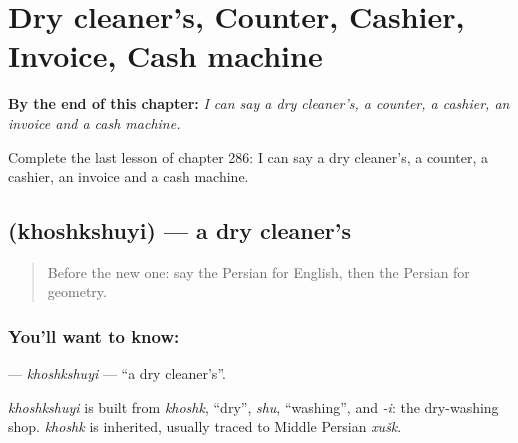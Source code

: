 
\chapter{Dry cleaner's, Counter, Cashier, Invoice, Cash machine}
\label{ch:fa-dry-cleaner-s-counter-cashier-invoice-cash-machine}

\begin{chapteropening}
\textbf{By the end of this chapter:} \emph{I can say a dry cleaner's, a counter, a cashier, an invoice and a cash machine.}

Complete the last lesson of chapter 286: I can say a dry cleaner's, a counter, a cashier, an invoice and a cash machine.
\end{chapteropening}

\section[\texorpdfstring{\fa{خشکشویی} (khoshkshuyi)}{خشکشویی (khoshkshuyi)}]{ (khoshkshuyi) — a dry cleaner's}

\label{lesson:FA-C286-khoshkshuyi}



\begin{quote}
Before the new one: say the Persian for English, then the Persian for geometry.
\end{quote}

\subsection*{You'll want to know: }
\textbf{} — \emph{khoshkshuyi} — \textquotedblleft{}a dry cleaner's\textquotedblright{}.

\begin{cousinweb}
\emph{khoshkshuyi} is built from \emph{khoshk}, \textquotedblleft{}dry\textquotedblright{}, \emph{shu}, \textquotedblleft{}washing\textquotedblright{}, and \emph{-i}: the dry-washing shop. \emph{khoshk} is inherited, usually traced to Middle Persian \emph{xušk}.
\end{cousinweb}

